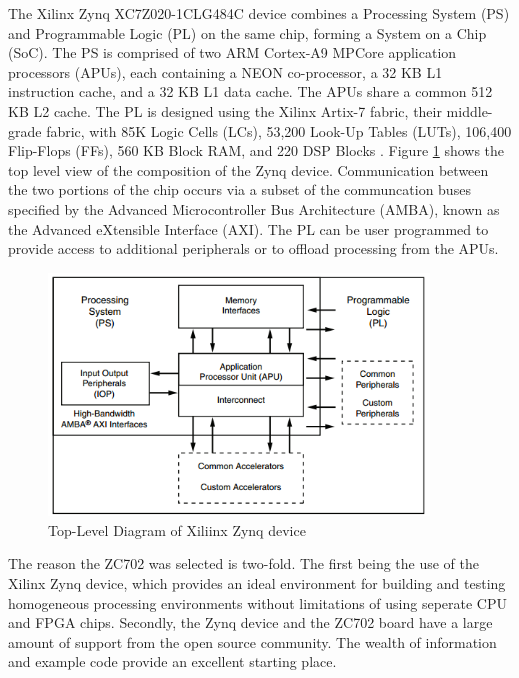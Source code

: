 The Xilinx Zynq XC7Z020-1CLG484C device combines a Processing System (PS) and Programmable Logic (PL) on the same chip, forming a System on a Chip (SoC).  The PS is comprised of two ARM Cortex-A9 MPCore application processors (APUs), each containing a NEON co-processor, a 32 KB L1 instruction cache, and a 32 KB L1 data cache.  The APUs share a common 512 KB L2 cache.  The PL is designed using the Xilinx Artix-7 fabric, their middle-grade fabric, with 85K Logic Cells (LCs), 53,200 Look-Up Tables (LUTs), 106,400 Flip-Flops (FFs), 560 KB Block RAM, and 220 DSP Blocks \cite{xilinx_zynq}. Figure \ref{fig:zynq_top_level} shows the top level view of the composition of the Zynq device.  Communication between the two portions of the chip occurs via a subset of the communcation buses specified by the Advanced Microcontroller Bus Architecture (AMBA), known as the Advanced eXtensible Interface (AXI).  The PL can be user programmed to provide access to additional peripherals or to offload processing from the APUs.

\begin{figure}[!h]
  \centering
  \includegraphics[width=0.9\textwidth]{./img/zynq_top_level.PNG}
  \caption{Top-Level Diagram of Xiliinx Zynq device}
  \label{fig:zynq_top_level}
\end{figure}

The reason the ZC702 was selected is two-fold.  The first being the use of the Xilinx Zynq device, which provides an ideal environment for building and testing homogeneous processing environments without limitations of using seperate CPU and FPGA chips.  Secondly, the Zynq device and the ZC702 board have a large amount of support from the open source community.  The wealth of information and example code provide an excellent starting place.

